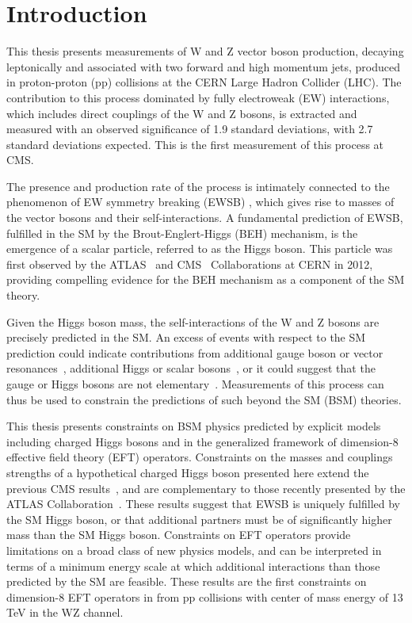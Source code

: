 \chapter{Introduction}

This thesis presents measurements of W and Z vector boson production, 
decaying leptonically and associated
with two forward and high momentum jets, produced in proton-proton (pp) collisions
at the CERN Large Hadron Collider (LHC). 
The contribution to this process dominated by fully electroweak (EW)
interactions, which includes direct couplings of the W and Z bosons, 
is extracted and measured with an observed significance of
1.9 standard deviations, with 2.7 standard deviations expected. 
This is the first measurement of this process at CMS. 

The presence and production rate of the \EWWZ process is intimately connected to the 
phenomenon of EW symmetry breaking (EWSB) \cite{Quigg:2009vq}, which gives rise to masses of
the vector bosons and their self-interactions. A fundamental prediction
of EWSB, fulfilled in the SM by the Brout-Englert-Higgs (BEH) mechanism,
is the emergence of a scalar particle, referred 
to as the Higgs boson. 
This particle was first observed by the 
ATLAS~\cite{Aad:2012tfa} and CMS~\cite{Chatrchyan:2012xdj,Chatrchyan:2013lba} Collaborations
at CERN in 2012, providing compelling evidence for the BEH mechanism as
a component of the SM theory.

Given the Higgs boson mass, the self-interactions 
of the W and Z bosons are precisely predicted in the SM. 
An excess of \EWWZ events with respect to the SM prediction could indicate contributions from 
additional gauge boson or vector resonances~\cite{Delgado:2017cls}, 
additional Higgs or scalar bosons~\cite{Kilian:2015opv}, 
or it could suggest that the gauge or Higgs bosons are not elementary~\cite{Csaki:2015hcd}.
Measurements of this process can thus be used to constrain the predictions
of such beyond the SM (BSM) theories. 

This thesis presents constraints on BSM physics predicted by explicit models
including charged Higgs bosons 
and in the generalized framework of dimension-8 effective field theory (EFT) operators.
Constraints on the masses and couplings strengths of a hypothetical
charged Higgs boson presented here extend the previous CMS results~\cite{Sirunyan:2017sbn}, and
are complementary to those recently presented by the ATLAS Collaboration~\cite{Aaboud:2018ohp}. 
These results suggest that EWSB is uniquely fulfilled by the SM Higgs boson,
or that additional partners must be of significantly higher mass than the
SM Higgs boson.
Constraints on EFT operators provide limitations on a broad class of new physics
models, and can be interpreted in terms of a minimum energy scale at which additional
interactions than those predicted by the SM are feasible.
These results are the first constraints on dimension-8 EFT operators 
in from pp collisions with center of mass energy of 13 TeV in the WZ channel.

